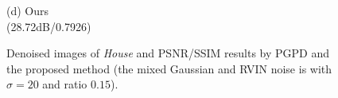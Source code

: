 \documentclass[runningheads]{llncs}
\begin{document}
\begin{figure}
{\begin{minipage}[t]{0.244\textwidth}
{\footnotesize (d) Ours \\(28.72dB/0.7926)}
\end{minipage}
}
\caption{Denoised images of \textsl{House} and PSNR/SSIM results by PGPD and the proposed method (the mixed Gaussian and RVIN noise is with $\sigma = 20$ and ratio $0.15$).}
\label{fig34}
\end{figure}

\begin{figure}
\centering
{}
\end{figure}
\end{document}
